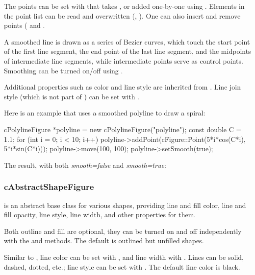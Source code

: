 The points can be set with  that takes ,
or added one-by-one using . Elements in the point list can be
read and overwritten (, ). One can also
insert and remove points ( and .

A smoothed line is drawn as a series of Bezier curves, which touch the
start point of the first line segment, the end point of the last line
segment, and the midpoints of intermediate line segments, while
intermediate points serve as control points. Smoothing can be turned on/off
using .

Additional properties such as color and line style are inherited from
. Line join style (which is not part of
) can be set with .

Here is an example that uses a smoothed polyline to draw a spiral:

\begin{cpp}
cPolylineFigure *polyline = new cPolylineFigure("polyline");
const double C = 1.1;
for (int i = 0; i < 10; i++)
    polyline->addPoint(cFigure::Point(5*i*cos(C*i), 5*i*sin(C*i)));
polyline->move(100, 100);
polyline->setSmooth(true);
\end{cpp}


The result, with both \textit{smooth=false} and \textit{smooth=true}:

\begin{center}

\end{center}


\subsubsection{cAbstractShapeFigure}
\label{sec:graphics:abstractshapefigure}

 is an abstract base class for various shapes,
providing line and fill color, line and fill opacity, line style, line
width, and other properties for them.

Both outline and fill are optional, they can be turned on and off
independently with the  and 
methods. The default is outlined but unfilled shapes.

Similar to , line color can be set with
, and line width with .
Lines can be solid, dashed, dotted, etc.; line style can be set with
. The default line color is black.

